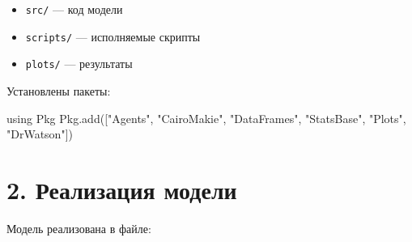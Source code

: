 \documentclass[
  english,
  russian,
  12pt,
  a4paper,
  DIV=11,
  numbers=noendperiod]{scrreprt}
\newenvironment{Shaded}{\begin{snugshade}}{\end{snugshade}}
\newcommand{\BuiltInTok}[1]{\textcolor[rgb]{0.00,0.23,0.31}{#1}}
\newcommand{\FunctionTok}[1]{\textcolor[rgb]{0.28,0.35,0.67}{#1}}
\newcommand{\ImportTok}[1]{\textcolor[rgb]{0.00,0.46,0.62}{#1}}
\newcommand{\NormalTok}[1]{\textcolor[rgb]{0.00,0.23,0.31}{#1}}
\newcommand{\StringTok}[1]{\textcolor[rgb]{0.13,0.47,0.30}{#1}}
\providecommand{\tightlist}{%
  \setlength{\itemsep}{0pt}\setlength{\parskip}{0pt}}
\begin{document}
\begin{itemize}
\tightlist
\item
  \texttt{src/} --- код модели
\item
  \texttt{scripts/} --- исполняемые скрипты
\item
  \texttt{plots/} --- результаты
\end{itemize}

Установлены пакеты:

\begin{Shaded}
\begin{Highlighting}[]
\ImportTok{using} \BuiltInTok{Pkg}
\BuiltInTok{Pkg}\NormalTok{.}\FunctionTok{add}\NormalTok{([}\StringTok{"Agents"}\NormalTok{, }\StringTok{"CairoMakie"}\NormalTok{, }\StringTok{"DataFrames"}\NormalTok{, }\StringTok{"StatsBase"}\NormalTok{, }\StringTok{"Plots"}\NormalTok{, }\StringTok{"DrWatson"}\NormalTok{])}
\end{Highlighting}
\end{Shaded}

\section{2. Реализация
модели}\label{ux440ux435ux430ux43bux438ux437ux430ux446ux438ux44f-ux43cux43eux434ux435ux43bux438}

Модель реализована в файле:
\end{document}
